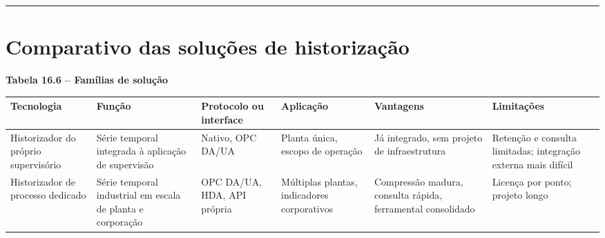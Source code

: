 \begin{center}\rule{0.5\linewidth}{0.5pt}\end{center}

\section{Comparativo das soluções de historização}\label{comparativo-das-soluuxe7uxf5es-de-historizauxe7uxe3o}

\textbf{Tabela 16.6 -- Famílias de solução}

\begin{longtable}[]{@{}
  >{\raggedright\arraybackslash}p{}
  >{\raggedright\arraybackslash}p{}
  >{\raggedright\arraybackslash}p{}
  >{\raggedright\arraybackslash}p{}
  >{\raggedright\arraybackslash}p{}
  >{\raggedright\arraybackslash}p{}@{}}
\toprule\noalign{}
\begin{minipage}[b]{\linewidth}\raggedright
Tecnologia
\end{minipage} & \begin{minipage}[b]{\linewidth}\raggedright
Função
\end{minipage} & \begin{minipage}[b]{\linewidth}\raggedright
Protocolo ou interface
\end{minipage} & \begin{minipage}[b]{\linewidth}\raggedright
Aplicação
\end{minipage} & \begin{minipage}[b]{\linewidth}\raggedright
Vantagens
\end{minipage} & \begin{minipage}[b]{\linewidth}\raggedright
Limitações
\end{minipage} \\
\midrule\noalign{}
\endhead
\bottomrule\noalign{}
\endlastfoot
Historizador do próprio supervisório & Série temporal integrada à aplicação de supervisão & Nativo, OPC DA/UA & Planta única, escopo de operação & Já integrado, sem projeto de infraestrutura & Retenção e consulta limitadas; integração externa mais difícil \\
Historizador de processo dedicado & Série temporal industrial em escala de planta e corporação & OPC DA/UA, HDA, API própria & Múltiplas plantas, indicadores corporativos & Compressão madura, consulta rápida, ferramental consolidado & Licença por ponto; projeto longo \\

\end{longtable}
